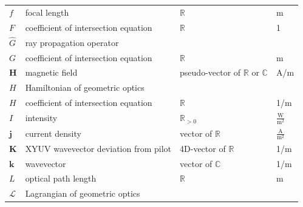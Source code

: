 \documentclass[12pt,a4paper,twoside,openright,BCOR10mm,headsepline,titlepage,abstracton,chapterprefix,final]{scrreprt}
\newcommand\Vector[1]{{\mathbf{#1}}}
\newcommand\wavenumber{k}
\newcommand\Wavevector{\Vector{\wavenumber}}
\newcommand\scalarHfield{H}
\newcommand\Hfield{\Vector{\scalarHfield}}
\newcommand\currentdensity{\Vector{j}}
\newcommand\meter{\textrm{m}}
\newcommand\ampere{\textrm{A}}
\newcommand\watt{\textrm{W}}
\begin{document}
\begin{tabular}{l|l|l|l}
 \hline
 $f$ & focal length & $\mathbb{R}$ & \meter \\
 $F$ & coefficient of intersection equation & $\mathbb{R}$ & 1\\
 \hline
 $\hat{G}$ & ray propagation operator &&\\
 $G$ & coefficient of intersection equation & $\mathbb{R}$ & \meter\\
 \hline
 $\Hfield$ & magnetic field & pseudo-vector of $\mathbb{R}$ or $\mathbb{C}$ & \ampere /\meter \\
 $H$ & Hamiltonian of geometric optics && \\
 $H$ & coefficient of intersection equation & $\mathbb{R}$ & 1/\meter \\
 \hline
 $I$ & intensity & $\mathbb{R}_{>0}$ & $\frac{\watt}{\meter^2}$ \\
 \hline
 $\currentdensity$ & current density & vector of $\mathbb{R}$ & $\frac{\ampere}{\meter^2}$ \\
 \hline
 $\Vector{K}$ & XYUV wavevector deviation from pilot & 4D-vector of $\mathbb{R}$ & 1/\meter \\
 $\Wavevector$ & wavevector & vector of $\mathbb{C}$ & 1/\meter \\
 \hline
 $L$ & optical path length & $\mathbb{R}$ & \meter \\
 $\mathcal{L}$ & Lagrangian of geometric optics &&\\
\end{tabular}\\
\end{document}
